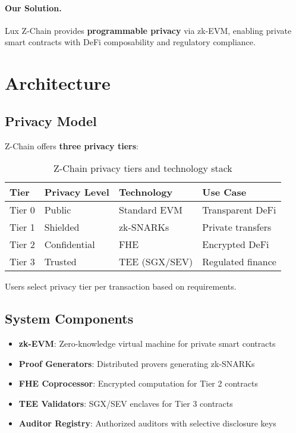 \documentclass[11pt]{article}
\begin{document}
\paragraph{Our Solution.} Lux Z-Chain provides \textbf{programmable privacy} via zk-EVM, enabling private smart contracts with DeFi composability and regulatory compliance.

\section{Architecture}

\subsection{Privacy Model}

Z-Chain offers \textbf{three privacy tiers}:

\begin{table}[h]
\centering
\begin{tabular}{llll}
\toprule
Tier & Privacy Level & Technology & Use Case \\
\midrule
Tier 0 & Public & Standard EVM & Transparent DeFi \\
Tier 1 & Shielded & zk-SNARKs & Private transfers \\
Tier 2 & Confidential & FHE & Encrypted DeFi \\
Tier 3 & Trusted & TEE (SGX/SEV) & Regulated finance \\
\bottomrule
\end{tabular}
\caption{Z-Chain privacy tiers and technology stack}
\end{table}

Users select privacy tier per transaction based on requirements.

\subsection{System Components}

\begin{itemize}[leftmargin=1.1em]
  \item \textbf{zk-EVM}: Zero-knowledge virtual machine for private smart contracts
  \item \textbf{Proof Generators}: Distributed provers generating zk-SNARKs
  \item \textbf{FHE Coprocessor}: Encrypted computation for Tier 2 contracts
  \item \textbf{TEE Validators}: SGX/SEV enclaves for Tier 3 contracts
  \item \textbf{Auditor Registry}: Authorized auditors with selective disclosure keys
\end{itemize}
\end{document}
